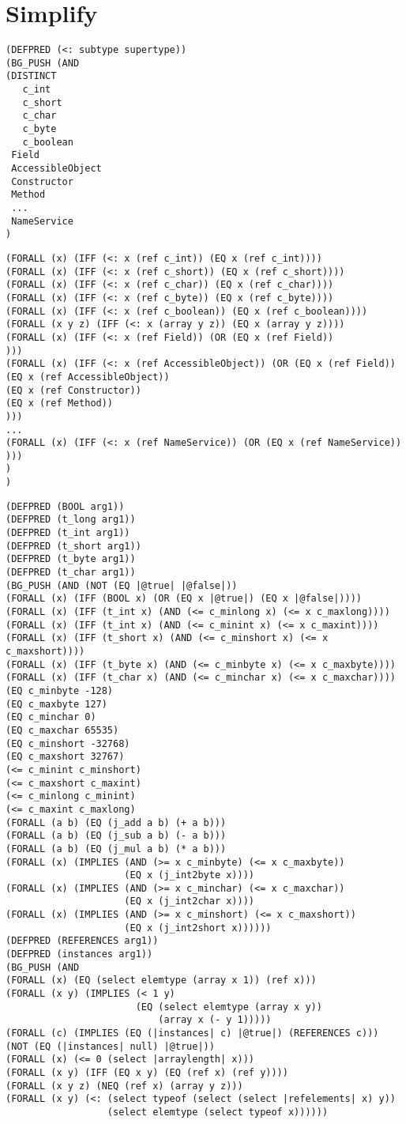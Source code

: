 \section{Simplify}
\begin{verbatim}
(DEFPRED (<: subtype supertype))
(BG_PUSH (AND
(DISTINCT 
   c_int
   c_short
   c_char
   c_byte
   c_boolean
 Field
 AccessibleObject
 Constructor
 Method
 ...
 NameService
)
\end{verbatim}
\begin{verbatim}
(FORALL (x) (IFF (<: x (ref c_int)) (EQ x (ref c_int))))
(FORALL (x) (IFF (<: x (ref c_short)) (EQ x (ref c_short))))
(FORALL (x) (IFF (<: x (ref c_char)) (EQ x (ref c_char))))
(FORALL (x) (IFF (<: x (ref c_byte)) (EQ x (ref c_byte))))
(FORALL (x) (IFF (<: x (ref c_boolean)) (EQ x (ref c_boolean))))
(FORALL (x y z) (IFF (<: x (array y z)) (EQ x (array y z))))
(FORALL (x) (IFF (<: x (ref Field)) (OR (EQ x (ref Field))
)))
(FORALL (x) (IFF (<: x (ref AccessibleObject)) (OR (EQ x (ref Field))
(EQ x (ref AccessibleObject))
(EQ x (ref Constructor))
(EQ x (ref Method))
)))
...
(FORALL (x) (IFF (<: x (ref NameService)) (OR (EQ x (ref NameService))
)))
)
)
\end{verbatim}
\begin{verbatim}
(DEFPRED (BOOL arg1))
(DEFPRED (t_long arg1))
(DEFPRED (t_int arg1))
(DEFPRED (t_short arg1))
(DEFPRED (t_byte arg1))
(DEFPRED (t_char arg1))
(BG_PUSH (AND (NOT (EQ |@true| |@false|))
(FORALL (x) (IFF (BOOL x) (OR (EQ x |@true|) (EQ x |@false|))))
(FORALL (x) (IFF (t_int x) (AND (<= c_minlong x) (<= x c_maxlong))))
(FORALL (x) (IFF (t_int x) (AND (<= c_minint x) (<= x c_maxint))))
(FORALL (x) (IFF (t_short x) (AND (<= c_minshort x) (<= x c_maxshort))))
(FORALL (x) (IFF (t_byte x) (AND (<= c_minbyte x) (<= x c_maxbyte))))
(FORALL (x) (IFF (t_char x) (AND (<= c_minchar x) (<= x c_maxchar))))
(EQ c_minbyte -128) 
(EQ c_maxbyte 127) 
(EQ c_minchar 0) 
(EQ c_maxchar 65535) 
(EQ c_minshort -32768) 
(EQ c_maxshort 32767)
(<= c_minint c_minshort) 
(<= c_maxshort c_maxint) 
(<= c_minlong c_minint) 
(<= c_maxint c_maxlong)
(FORALL (a b) (EQ (j_add a b) (+ a b))) 
(FORALL (a b) (EQ (j_sub a b) (- a b))) 
(FORALL (a b) (EQ (j_mul a b) (* a b)))
(FORALL (x) (IMPLIES (AND (>= x c_minbyte) (<= x c_maxbyte)) 
                     (EQ x (j_int2byte x))))
(FORALL (x) (IMPLIES (AND (>= x c_minchar) (<= x c_maxchar)) 
                     (EQ x (j_int2char x))))
(FORALL (x) (IMPLIES (AND (>= x c_minshort) (<= x c_maxshort)) 
                     (EQ x (j_int2short x))))))
(DEFPRED (REFERENCES arg1))
(DEFPRED (instances arg1))
(BG_PUSH (AND
(FORALL (x) (EQ (select elemtype (array x 1)) (ref x)))
(FORALL (x y) (IMPLIES (< 1 y) 
                       (EQ (select elemtype (array x y)) 
                           (array x (- y 1)))))
(FORALL (c) (IMPLIES (EQ (|instances| c) |@true|) (REFERENCES c)))
(NOT (EQ (|instances| null) |@true|))
(FORALL (x) (<= 0 (select |arraylength| x)))
(FORALL (x y) (IFF (EQ x y) (EQ (ref x) (ref y))))
(FORALL (x y z) (NEQ (ref x) (array y z)))
(FORALL (x y) (<: (select typeof (select (select |refelements| x) y)) 
                  (select elemtype (select typeof x)))))) 
\end{verbatim}
